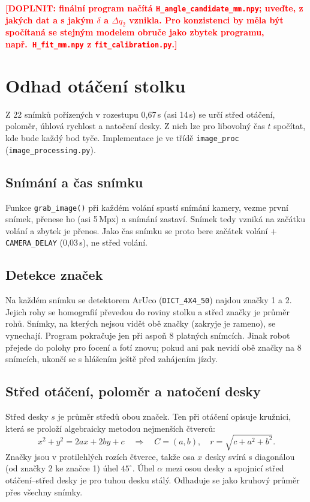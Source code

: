 \documentclass[11pt,a4paper]{article}
\newcommand{\doplnit}[1]{\textcolor{red}{\textbf{[DOPLNIT: #1]}}}
\begin{document}
\doplnit{finální program načítá \texttt{H\_angle\_candidate\_mm.npy}; uveďte, z jakých dat a
s jakým $\delta$ a $\Delta q_2$ vznikla. Pro konzistenci by měla být spočítaná se stejným modelem
obruče jako zbytek programu, např.\ \texttt{H\_fit\_mm.npy} z \texttt{fit\_calibration.py}.}

\section{Odhad otáčení stolku}
\label{sec:otaceni}

Z 22 snímků pořízených v rozestupu 0{,}67\,s (asi 14\,s) se určí střed otáčení, poloměr,
úhlová rychlost a natočení desky. Z nich lze pro libovolný čas $t$ spočítat, kde bude každý
bod tyče. Implementace je ve třídě \texttt{image\_proc} (\texttt{image\_processing.py}).

\subsection{Snímání a čas snímku}

Funkce \texttt{grab\_image()} při každém volání spustí snímání kamery, vezme první snímek,
přenese ho (asi 5\,Mpx) a snímání zastaví. Snímek tedy vzniká na začátku volání a zbytek je
přenos. Jako čas snímku se proto bere začátek volání $+$ \texttt{CAMERA\_DELAY} (0{,}03\,s),
ne střed volání.

\subsection{Detekce značek}

Na každém snímku se detektorem ArUco (\texttt{DICT\_4X4\_50}) najdou značky 1 a 2. Jejich rohy
se homografií převedou do roviny stolku a střed značky je průměr rohů. Snímky, na kterých
nejsou vidět obě značky (zakryje je rameno), se vynechají. Program pokračuje jen při
aspoň 8 platných snímcích. Jinak robot přejede do polohy pro focení a fotí znovu; pokud ani
pak nevidí obě značky na 8 snímcích, ukončí se s hlášením 
ještě před zahájením jízdy.

\subsection{Střed otáčení, poloměr a natočení desky}

Střed desky $s$ je průměr středů obou značek. Ten při otáčení opisuje kružnici, která se
proloží algebraicky metodou nejmenších čtverců:
\begin{equation}
  x^2 + y^2 = 2ax + 2by + c \quad\Rightarrow\quad C = (a, b),\quad r = \sqrt{c + a^2 + b^2}.
\end{equation}
Značky jsou v protilehlých rozích čtverce, takže osa $x$ desky svírá s diagonálou (od značky 2
ke značce 1) úhel $45^\circ$. Úhel $\alpha$ mezi osou desky a spojnicí střed otáčení--střed
desky je pro tuhou desku stálý. Odhaduje se jako kruhový průměr přes všechny snímky.
\end{document}

